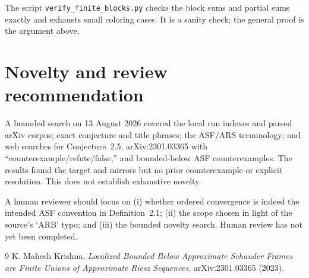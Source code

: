 \documentclass[11pt]{article}
\begin{document}
The script \texttt{verify\_finite\_blocks.py} checks the block sums and partial
sums exactly and exhausts small coloring cases. It is a sanity check; the
general proof is the argument above.

\section{Novelty and review recommendation}

A bounded search on 13 August 2026 covered the local run indexes and parsed
arXiv corpus; exact conjecture and title phrases; the ASF/ARS terminology;
and web searches for Conjecture~2.5, arXiv:2301.03365 with
``counterexample/refute/false,'' and bounded-below ASF counterexamples. The
results found the target and mirrors but no prior counterexample or explicit
resolution. This does not establish exhaustive novelty.

A human reviewer should focus on (i) whether ordered convergence is indeed
the intended ASF convention in Definition~2.1; (ii) the scope chosen in light
of the source's `ARB' typo; and (iii) the bounded novelty search. Human review
has not yet been completed.

\begin{thebibliography}{9}
K. Mahesh Krishna,
\emph{Localized Bounded Below Approximate Schauder Frames are Finite Unions
of Approximate Riesz Sequences}, arXiv:2301.03365 (2023).
\end{thebibliography}
\end{document}
